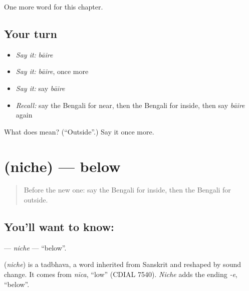 \begin{grammarlens}[title={What you've built}]
One more word for this chapter.
\end{grammarlens}

\subsection*{Your turn}
\begin{itemize}
\raggedright
  \item \emph{Say it:} \emph{bāire}
  \item \emph{Say it:} \emph{bāire}, once more
  \item \emph{Say it:} say \emph{bāire}
  \item \emph{Recall:} say the Bengali for near, then the Bengali for inside, then say \emph{bāire} again
\end{itemize}

\begin{tcolorbox}[breakable,colback=teal!4,colframe=teal!35!black,title={Before you move on}]
What does  mean? (\textquotedblleft{}Outside\textquotedblright{}.) Say it once more.
\end{tcolorbox}
\section[\texorpdfstring{\bn{নিচে} (niche)}{নিচে (niche)}]{ (niche) — below}

\label{lesson:BN-C81-niche}



\begin{quote}
Before the new one: say the Bengali for inside, then the Bengali for outside.
\end{quote}

\subsection*{You'll want to know: }
\textbf{} — \emph{niche} — \textquotedblleft{}below\textquotedblright{}.

\begin{cousinweb}
\textbf{} (\emph{niche}) is a tadbhava, a word inherited from Sanskrit and reshaped by sound change. It comes from \emph{nīca}, \textquotedblleft{}low\textquotedblright{} (CDIAL 7540). \emph{Niche} adds the ending \emph{-e}, \textquotedblleft{}below\textquotedblright{}.
\end{cousinweb}

